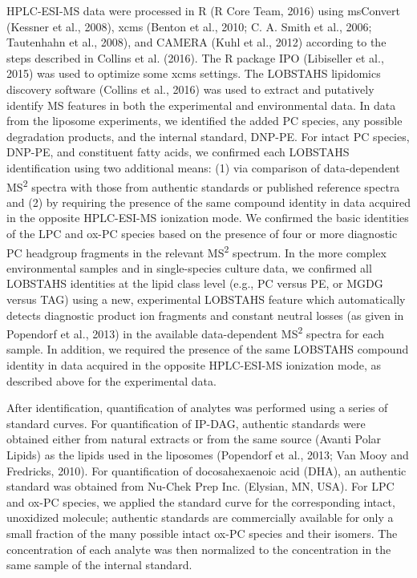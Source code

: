 HPLC-ESI-MS data were processed in R (R Core Team, 2016) using msConvert (Kessner et al., 2008), xcms (Benton et al., 2010; C. A. Smith et al., 2006; Tautenhahn et al., 2008), and CAMERA (Kuhl et al., 2012) according to the steps described in Collins et al. (2016). The R package IPO (Libiseller et al., 2015) was used to optimize some xcms settings. The LOBSTAHS lipidomics discovery software (Collins et al., 2016) was used to extract and putatively identify MS features in both the experimental and environmental data. In data from the liposome experiments, we identified the added PC species, any possible degradation products, and the internal standard, DNP-PE. For intact PC species, DNP-PE, and constituent fatty acids, we confirmed each LOBSTAHS identification using two additional means: (1) via comparison of data-dependent MS\textsuperscript{2} spectra with those from authentic standards or published reference spectra and (2) by requiring the presence of the same compound identity in data acquired in the opposite HPLC-ESI-MS ionization mode. We confirmed the basic identities of the LPC and ox-PC species based on the presence of four or more diagnostic PC headgroup fragments in the relevant MS\textsuperscript{2} spectrum. In the more complex environmental samples and in single-species culture data, we confirmed all LOBSTAHS identities at the lipid class level (e.g., PC versus PE, or MGDG versus TAG) using a new, experimental LOBSTAHS feature which automatically detects diagnostic product ion fragments and constant neutral losses (as given in Popendorf et al., 2013) in the available data-dependent MS\textsuperscript{2} spectra for each sample. In addition, we required the presence of the same LOBSTAHS compound identity in data acquired in the opposite HPLC-ESI-MS ionization mode, as described above for the experimental data.

After identification, quantification of analytes was performed using a series of standard curves. For quantification of IP-DAG, authentic standards were obtained either from natural extracts or from the same source (Avanti Polar Lipids) as the lipids used in the liposomes (Popendorf et al., 2013; Van Mooy and Fredricks, 2010). For quantification of docosahexaenoic acid (DHA), an authentic standard was obtained from Nu-Chek Prep Inc. (Elysian, MN, USA). For LPC and ox-PC species, we applied the standard curve for the corresponding intact, unoxidized molecule; authentic standards are commercially available for only a small fraction of the many possible intact ox-PC species and their isomers. The concentration of each analyte was then normalized to the concentration in the same sample of the internal standard.


